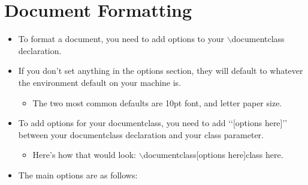 \section{Document Formatting}
	\begin{itemize}
		\item To format a document, you need to add options to your $\backslash$documentclass declaration.
		\item If you don\rq{}t set anything in the options section, they will default to whatever the environment default on your machine is.
		\begin{itemize}
			\item The two most common defaults are 10pt font, and letter paper size.
		\end{itemize}
		\item To add options for your documentclass, you need to add \lq\lq{}[options here]\rq\rq{} between your documentclass declaration and your class parameter.
		\begin{itemize}
			\item Here\rq{}s how that would look: $\backslash$documentclass[options here]{class here}.
		\end{itemize}
		\item The main options are as follows:
	\end{itemize}
		\def\arraystretch{1.1}
